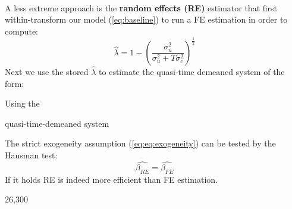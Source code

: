 \medskip\\
A less extreme approach is the \textbf{random effects (RE)} estimator that first within-transform our model (\ref{eq:baseline}) to run a FE estimation in order to compute:
\begin{equation}
  \widehat{\lambda}=1-\left(\frac{\sigma^2_u}{\sigma^2_u+T\sigma^2_c}\right)^\frac{1}{2}
\end{equation}
Next we use the stored $\widehat{\lambda}$ to estimate the quasi-time demeaned system of the form:


Using the

quasi-time-demeaned system

The strict exogeneity assumption (\ref{eq:eq:exogeneity}) can be tested by the Hausman test:
\begin{equation}
  \widehat{\beta_{RE}}=\widehat{\beta_{FE}}
  \label{eq:hausman}
\end{equation}
If it holds RE is indeed more efficient than FE estimation.

26,300

